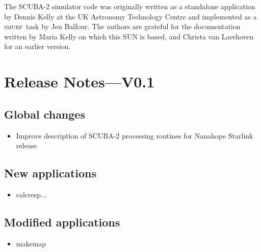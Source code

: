 \documentclass[twoside,11pt]{article}
\renewcommand{\_}{\texttt{\symbol{95}}}
\newcommand{\SMURF}{\textsc{smurf}}
\begin{document}
The SCUBA-2 simulator code was originally written as a standalone
application by Dennis Kelly at the UK Astronomy Technology Centre and
implemented as a \SMURF\ task by Jen Balfour. The authors are grateful
for the documentation written by Maria Kelly on which this SUN is
based, and Christa van Laerhoven for an earlier version.


\section{Release Notes---V0.1}

\subsection{Global changes}
\begin{itemize}
  \item Improve description of SCUBA-2 processing routines for Nanahope Starlink release
\end{itemize}

\subsection{New applications}
\begin{itemize}
  \item calcresp...
\end{itemize}

\subsection{Modified applications}
\begin{itemize}
  \item makemap
\end{itemize}
\end{document}
